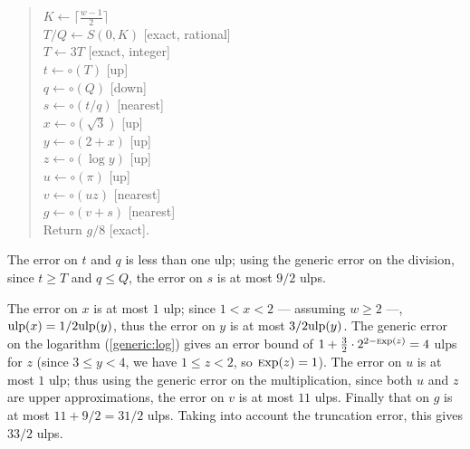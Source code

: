 \documentclass[12pt]{amsart}
\def\ulp{{\rm ulp}}
\def\Exp{{\rm \textsc exp}}
\begin{document}
\begin{quote}
$K \leftarrow \lceil \frac{w-1}{2} \rceil$ \\
$T/Q \leftarrow S(0,K)$ [exact, rational] \\
$T \leftarrow 3T$ [exact, integer] \\
$t \leftarrow \circ(T)$ [up] \\
$q \leftarrow \circ(Q)$ [down] \\
$s \leftarrow \circ(t/q)$ [nearest] \\
$x \leftarrow \circ(\sqrt{3})$ [up] \\
$y \leftarrow \circ(2 + x)$ [up] \\
$z \leftarrow \circ(\log y)$ [up] \\
$u \leftarrow \circ(\pi)$  [up] \\
$v \leftarrow \circ(u z)$ [nearest] \\
$g \leftarrow \circ(v + s)$ [nearest] \\
Return $g/8$ [exact].
\end{quote}
The error on $t$ and $q$ is less than one ulp;
using the generic error on the division, since $t \geq T$ and $q \leq Q$,
the error on $s$ is at most $9/2$ ulps.

The error on $x$ is at most $1$ ulp; since $1 < x < 2$ --- assuming
$w \geq 2$ ---, $\ulp(x) = 1/2 \ulp(y)$, thus the error on $y$ is at most
$3/2 \ulp(y)$.
The generic error on the logarithm (\textsection\ref{generic:log})
gives an error bound of $1 + \frac{3}{2} \cdot 2^{2-\Exp(z)} = 4$ ulps for $z$
(since $3 \leq y < 4$, we have $1 \leq z < 2$, so $\Exp(z) = 1$).
The error on $u$ is at most $1$ ulp; thus using the generic error on the
multiplication, since both $u$ and $z$ are upper approximations,
the error on $v$ is at most $11$ ulps.
Finally that on $g$ is at most $11 + 9/2 = 31/2$ ulps.
Taking into account the truncation error, this gives $33/2$ ulps.

\nocite{BoBo98,DeHi02,HuAb86,Jones84}



\end{document}
